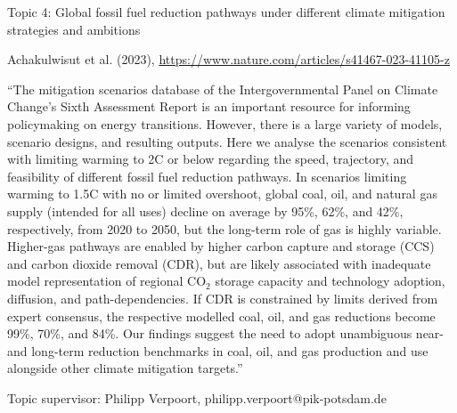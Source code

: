 \documentclass[10pt,aspectratio=169,dvipsnames]{beamer}
\begin{document}
\begin{frame}
  \begin{block}{Topic 4: Global fossil fuel reduction pathways under different climate mitigation strategies and ambitions}
      
    Achakulwisut et al. (2023), \href{https://www.nature.com/articles/s41467-023-41105-z}{https://www.nature.com/articles/s41467-023-41105-z}
    
    \enquote{The mitigation scenarios database of the Intergovernmental Panel on Climate Change's Sixth Assessment Report is an important resource for informing policymaking on energy transitions. However, there is a large variety of models, scenario designs, and resulting outputs. Here we analyse the scenarios consistent with limiting warming to 2\degree\hspace{0pt}C or below regarding the speed, trajectory, and feasibility of different fossil fuel reduction pathways. In scenarios limiting warming to 1.5\degree\hspace{0pt}C with no or limited overshoot, global coal, oil, and natural gas supply (intended for all uses) decline on average by 95\%, 62\%, and 42\%, respectively, from 2020 to 2050, but the long-term role of gas is highly variable. Higher-gas pathways are enabled by higher carbon capture and storage (CCS) and carbon dioxide removal (CDR), but are likely associated with inadequate model representation of regional CO$_2$ storage capacity and technology adoption, diffusion, and path-dependencies. If CDR is constrained by limits derived from expert consensus, the respective modelled coal, oil, and gas reductions become 99\%, 70\%, and 84\%. Our findings suggest the need to adopt unambiguous near- and long-term reduction benchmarks in coal, oil, and gas production and use alongside other climate mitigation targets.}

    \hfill
    Topic supervisor: Philipp Verpoort, philipp.verpoort@pik-potsdam.de
    
  \end{block}
\end{frame}
\end{document}

